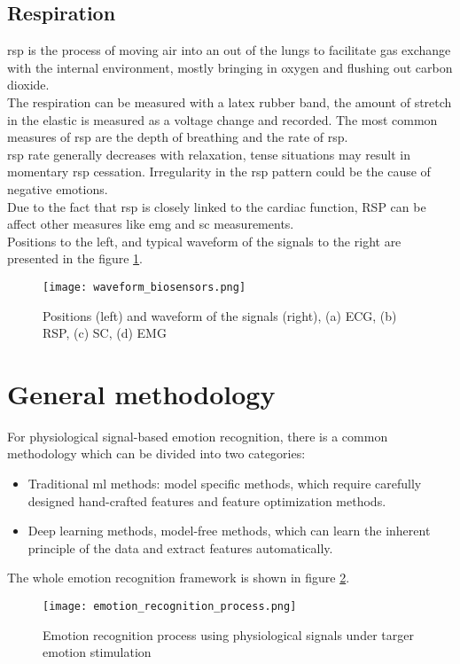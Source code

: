 \subsection{Respiration}
\gls{rsp} is the process of moving air into an out of the lungs to facilitate gas exchange with the internal environment, mostly bringing in oxygen and flushing out carbon dioxide.
\\
The respiration can be measured with a latex rubber band, the amount of stretch in the elastic is measured as a voltage change and recorded. The most common measures of \gls{rsp} are the depth of breathing and the rate of \gls{rsp}.
\\ \indent
\gls{rsp} rate generally decreases with relaxation, tense situations may result in momentary \gls{rsp} cessation. Irregularity in the \gls{rsp} pattern could be the cause of negative emotions.
\\
Due to the fact that \gls{rsp} is closely linked to the cardiac function, RSP can be affect other measures like \gls{emg} and \gls{sc} measurements.
\\
Positions to the left, and typical waveform of the signals to the right are presented in the figure \ref{fig:waveform_biosensors}.
\begin{figure}[h]
    \centering
    \texttt{[image: waveform\_biosensors.png]} 
	\caption{Positions (left) and waveform of the signals (right), (a) ECG, (b) RSP, (c) SC, (d) EMG}
    \label{fig:waveform_biosensors}
\end{figure}

\section{General methodology}\label{general_methodology}
For physiological signal-based emotion recognition, there is a common methodology which can be divided into two categories:
\begin{itemize}
	\item Traditional \gls{ml} methods: model specific methods, which require carefully designed hand-crafted features and feature optimization methods.
	\item Deep learning methods, model-free methods, which can learn the inherent principle of the data and extract features automatically.
\end{itemize}
The whole emotion recognition framework is shown in figure \ref{fig:emotion_recognition_process}.
\begin{figure}[h]
    \centering
    \texttt{[image: emotion\_recognition\_process.png]} 
	\caption{Emotion recognition process using physiological signals under targer emotion stimulation}
    \label{fig:emotion_recognition_process}
\end{figure}

